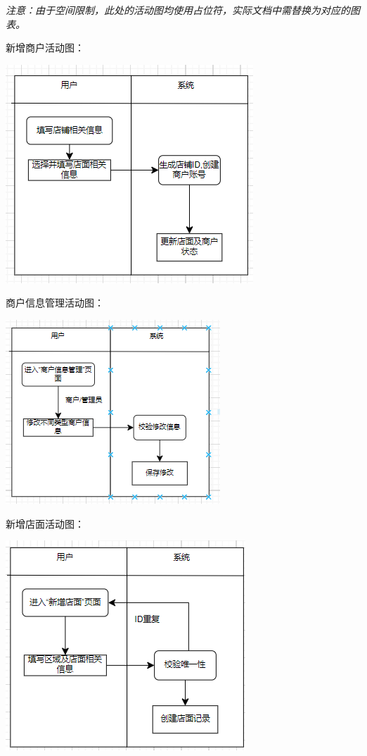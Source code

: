 \documentclass[]{article}
\let\oldincludegraphics\includegraphics
\renewcommand{\includegraphics}[2][]{%
  \begin{center}\oldincludegraphics[#1]{#2}\end{center}%
}
\begin{document}
\textit{注意：由于空间限制，此处的活动图均使用占位符，实际文档中需替换为对应的图表。}

新增商户活动图：
\includegraphics{media/2.7/image26.png}

商户信息管理活动图：
\includegraphics{media/2.7/image27.png}

新增店面活动图：
\includegraphics{media/2.7/image28.png}
\end{document}
